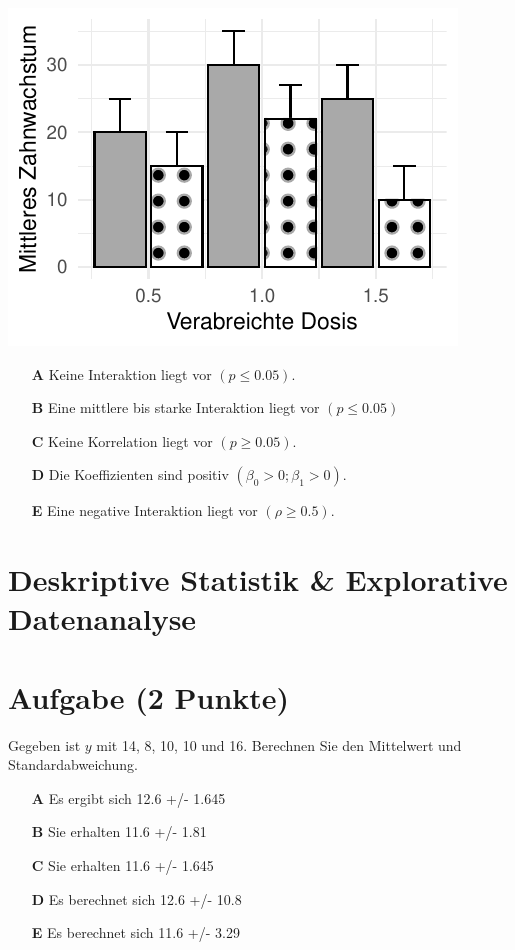 \documentclass[a4paper, 9pt]{scrartcl}\usepackage[]{graphicx}\usepackage[]{xcolor}
\makeatletter
\def\maxwidth{ %
  \ifdim\Gin@nat@width>\linewidth
    \linewidth
  \else
    \Gin@nat@width
  \fi
}
\makeatother
\begin{document}
{\centering \includegraphics[width=\maxwidth]{img/mc-anova-02-a-1} 

}







\begin{enumerate}
\item [\textbf{A} \msquare] Keine Interaktion liegt vor $(p \leq 0.05)$.
\item [\textbf{B} \msquare] Eine mittlere bis starke Interaktion liegt vor $(p \leq 0.05)$
\item [\textbf{C} \msquare] Keine Korrelation liegt vor $(p \geq 0.05)$.
\item [\textbf{D} \msquare] Die Koeffizienten sind positiv $(\beta_0 > 0; \beta_1 > 0)$.
\item [\textbf{E} \msquare] Eine negative Interaktion liegt vor $(\rho \geq 0.5)$.
\end{enumerate} 
\section*{Deskriptive Statistik \& Explorative Datenanalyse}

\section{Aufgabe \hfill (2 Punkte)}




Gegeben ist $y$ mit 14, 8, 10, 10 und 16. Berechnen Sie den Mittelwert und Standardabweichung.



\begin{enumerate}
\item [\textbf{A} \msquare] Es ergibt sich 12.6 +/- 1.645
\item [\textbf{B} \msquare] Sie erhalten 11.6 +/- 1.81
\item [\textbf{C} \msquare] Sie erhalten 11.6 +/- 1.645
\item [\textbf{D} \msquare] Es berechnet sich 12.6 +/- 10.8
\item [\textbf{E} \msquare] Es berechnet sich 11.6 +/- 3.29
\end{enumerate} 
\end{document}
